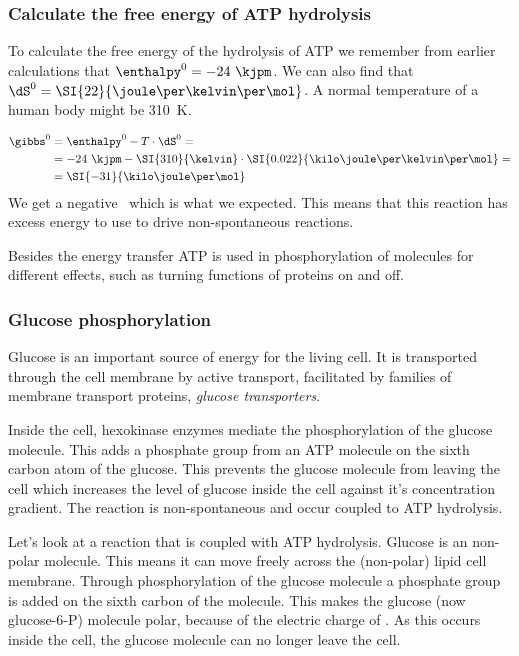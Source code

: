 \documentclass[../mit-general-chemistry.tex]{subfiles}
\begin{document}



\subsubsection{Calculate the free energy of ATP hydrolysis}

To calculate the free energy of the hydrolysis of ATP we remember from
earlier calculations that $\enthalpy^0 = -24~\kjpm$. We can also find
that $\dS^0 = \SI{22}{\joule\per\kelvin\per\mol}$. A normal
temperature of a human body might be \SI{310}{\kelvin}.

\begin{align*}
  \gibbs^0 &= \enthalpy^0 - T \cdot \dS^0 =\\
  &=  -24~\kjpm - \SI{310}{\kelvin} \cdot \SI{0.022}{\kilo\joule\per\kelvin\per\mol} =\\
  &= \SI{-31}{\kilo\joule\per\mol} \\
\end{align*}
We get a negative \gibbs\ which is what we expected. This means that
this reaction has excess energy to use to drive non-spontaneous
reactions.

Besides the energy transfer ATP is used in phosphorylation of
molecules for different effects, such as turning functions of proteins
on and off.




\subsubsection{Glucose phosphorylation}


Glucose is an important source of energy for the living cell. It is
transported through the cell membrane by active transport, facilitated
by families of membrane transport proteins, {\em glucose
  transporters}.

Inside the cell, hexokinase enzymes mediate the phosphorylation of the
glucose molecule. This adds a phosphate group from an ATP molecule on
the sixth carbon atom of the glucose. This prevents the glucose
molecule from leaving the cell which increases the level of glucose
inside the cell against it's concentration gradient. The reaction is
non-spontaneous and occur coupled to ATP hydrolysis.


Let's look at a reaction that is coupled with ATP hydrolysis. Glucose
is an non-polar molecule. This means it can move freely across the
(non-polar) lipid cell membrane. Through phosphorylation of the glucose
molecule a phosphate group is added on the sixth carbon of the
molecule. This makes the glucose (now glucose-6-P) molecule polar,
because of the electric charge of . As this occurs inside the cell,
the glucose molecule can no longer leave the cell.
\end{document}
